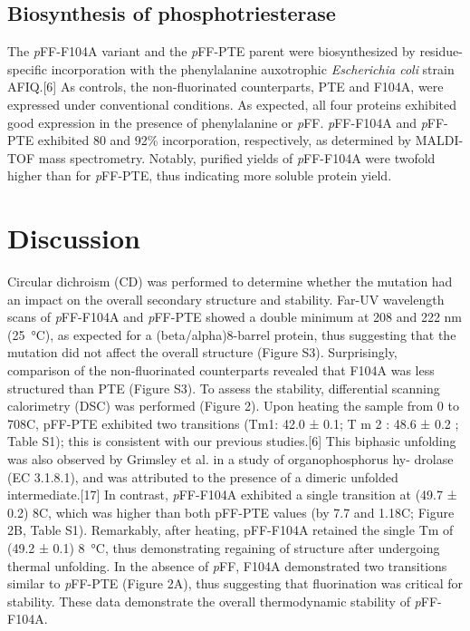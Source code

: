 \begin{refsection}
\subsection{Biosynthesis of phosphotriesterase}

The \emph{p}FF-F104A variant and the \emph{p}FF-PTE parent were biosynthesized
by residue-specific incorporation with the phenylalanine auxotrophic
\emph{Escherichia coli} strain AFIQ.[6] As controls, the non-fluorinated
counterparts, PTE and F104A, were expressed under conventional conditions. As
expected, all four proteins exhibited good expression in the presence of
phenylalanine or \emph{p}FF. \emph{p}FF-F104A and \emph{p}FF-PTE exhibited 80
and 92\% incorporation, respectively, as determined by MALDI-TOF mass
spectrometry. Notably, purified yields of \emph{p}FF-F104A were twofold higher
than for \emph{p}FF-PTE, thus indicating more soluble protein yield.

\section{Discussion}

Circular dichroism (CD) was performed to determine whether the mutation had an
impact on the overall secondary structure and stability. Far-UV wavelength
scans of \emph{p}FF-F104A and \emph{p}FF-PTE showed a double minimum at 208 and
222 nm (\SI{25}{\celsius}), as expected for a (beta/alpha)8-barrel protein, thus
suggesting that the mutation did not affect the overall structure (Figure S3).
Surprisingly, comparison of the non-fluorinated counterparts revealed that
F104A was less structured than PTE (Figure S3). To assess the stability,
differential scanning calorimetry (DSC) was performed (Figure 2). Upon heating
the sample from 0 to 708C, pFF-PTE exhibited two transitions (Tm1:
42.0 ± 0.1; T m 2 : 48.6 ± 0.2 ; Table
S1); this is consistent with our previous studies.[6] This biphasic unfolding
was also observed by Grimsley et al. in a study of organophosphorus hy- drolase
(EC 3.1.8.1), and was attributed to the presence of a dimeric unfolded
intermediate.[17] In contrast, \emph{p}FF-F104A exhibited a single transition
at (49.7 ± 0.2) 8C, which was higher than both pFF-PTE values (by 7.7 and
1.18C; Figure 2B, Table S1).  Remarkably, after heating, pFF-F104A retained the
single Tm of (49.2 ± 0.1) \SI{8}{\celsius}, thus demonstrating regaining of
structure after undergoing thermal unfolding.  In the absence of \emph{p}FF,
F104A demonstrated two transitions similar to \emph{p}FF-PTE (Figure 2A), thus
suggesting that fluorination was critical for stability. These data demonstrate
the overall thermodynamic stability of \emph{p}FF-F104A.


\end{refsection}
